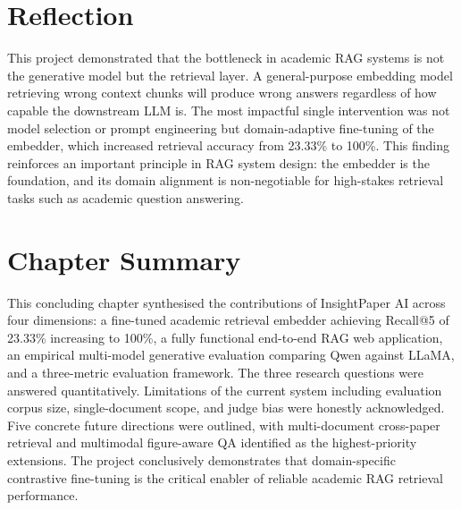 \section{Reflection}

This project demonstrated that the bottleneck in academic RAG systems is not the generative model but the retrieval layer. A general-purpose embedding model retrieving wrong context chunks will produce wrong answers regardless of how capable the downstream LLM is. The most impactful single intervention was not model selection or prompt engineering but domain-adaptive fine-tuning of the embedder, which increased retrieval accuracy from 23.33\% to 100\%. This finding reinforces an important principle in RAG system design: the embedder is the foundation, and its domain alignment is non-negotiable for high-stakes retrieval tasks such as academic question answering.

\section{Chapter Summary}

This concluding chapter synthesised the contributions of InsightPaper AI across four dimensions: a fine-tuned academic retrieval embedder achieving Recall@5 of 23.33\% increasing to 100\%, a fully functional end-to-end RAG web application, an empirical multi-model generative evaluation comparing Qwen against LLaMA, and a three-metric evaluation framework. The three research questions were answered quantitatively. Limitations of the current system including evaluation corpus size, single-document scope, and judge bias were honestly acknowledged. Five concrete future directions were outlined, with multi-document cross-paper retrieval and multimodal figure-aware QA identified as the highest-priority extensions. The project conclusively demonstrates that domain-specific contrastive fine-tuning is the critical enabler of reliable academic RAG retrieval performance.

